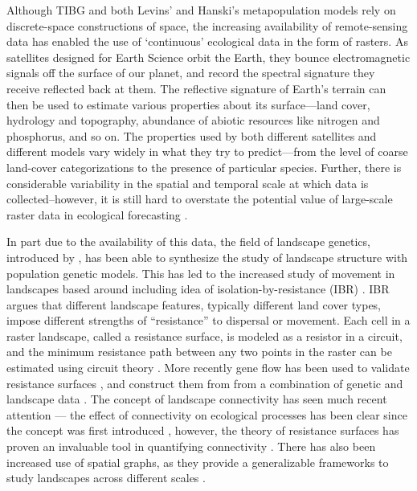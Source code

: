\documentclass[]{article}
\begin{document}
Although TIBG and both Levins' and Hanski's metapopulation models rely
on discrete-space constructions of space, the increasing
availability of remote-sensing data has enabled the use of `continuous'
ecological data in the form of rasters. As satellites designed for Earth Science orbit the
Earth, they bounce electromagnetic signals off the surface of our
planet, and record the spectral signature they receive reflected back at
them. The reflective signature of Earth's terrain can then be used to
estimate various properties about its surface---land cover, hydrology
and topography, abundance of abiotic resources like nitrogen and
phosphorus, and so on. The properties used by both different satellites
and different models vary widely in what they try to predict---from the
level of coarse land-cover categorizations to the presence of particular
species. Further, there is considerable variability in the spatial and temporal scale at which data is collected--however, it is still hard to
overstate the potential value of large-scale raster data in ecological
forecasting \cite{dietze_prediction_2017, dietze_iterative_2018, dietze_forecasting_2019}.

In part due to the availability of this data, the field of landscape genetics, introduced by \cite{manel_landscape_2003}, has been able to synthesize the study of landscape structure with population genetic models.
This has led to the increased study of movement in landscapes based around including idea of isolation-by-resistance (IBR)  \cite{mcrae_isolation_2006, mcrae_using_2008}.
IBR argues that different landscape features, typically different land cover types, impose different strengths of “resistance” to dispersal or movement. Each cell in a raster landscape, called a resistance surface, is modeled as a resistor in a circuit, and the minimum resistance path between any two points in the raster can be estimated using circuit theory \cite{spear_use_2010}.
More recently gene flow has been used to validate resistance surfaces \cite{mateo-sanchez_comparative_2015}, and construct them from from a combination of genetic and landscape data \cite{peterman_resistancega_2018}. The concept of landscape connectivity has seen much recent attention \cite{robertson_isolating_2018, carroll_use_2012, krosby_ecological_2010}---
the effect of connectivity on ecological processes has been clear since the concept was first
introduced \cite{turner_landscape_1989, taylor_connectivity_1993}, however, the theory of resistance surfaces has
proven an invaluable tool in quantifying connectivity \cite{kool_population_2013}. There has also been increased use of spatial graphs, as they provide a generalizable
frameworks to study landscapes across different scales \cite{chubaty_r_2020,dale_graphs_2010,minor_graph-theory_2008, urban_landscape_2001}.
\end{document}
